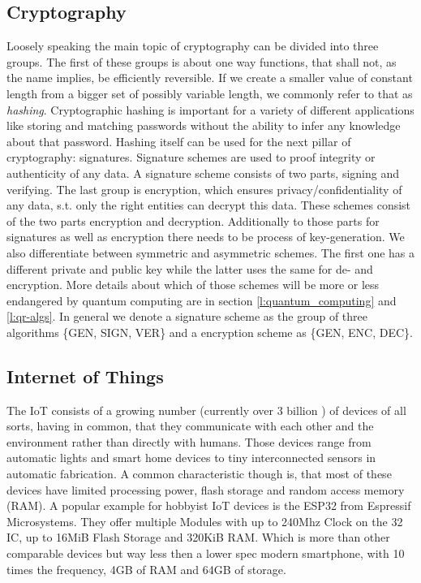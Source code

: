 \documentclass[conference]{IEEEtran}
\newcommand{\comment}[1]{}
\begin{document}
\subsection{Cryptography}\label{bg:crypto}
Loosely speaking the main topic of cryptography can be divided into three groups.
The first of these groups is about one way functions, that shall not, as the name implies, be efficiently reversible.
If we create a smaller value of constant length from a bigger set of possibly variable length, we commonly refer to that as \textit{hashing}.
Cryptographic hashing is important for a variety of different applications like storing and matching passwords without the ability to infer any knowledge about that password.
Hashing itself can be used for the next pillar of cryptography: signatures.
Signature schemes are used to proof integrity or authenticity of any data.
A signature scheme consists of two parts, signing and verifying. 
The last group is encryption, which ensures privacy/confidentiality of any data, s.t. only the right entities can decrypt this data.
These schemes consist of the two parts encryption and decryption.
Additionally to those parts for signatures as well as encryption there needs to be process of key-generation.
We also differentiate between symmetric and asymmetric schemes. The first one has a different private and public key while the latter uses the same for de- and encryption.
More details about which of those schemes will be more or less endangered by quantum computing are in section \ref{l:quantum_computing} and \ref{l:qr-algs}.
\newline
In general we denote a signature scheme as the group of three algorithms \{GEN, SIGN, VER\} and a encryption scheme as \{GEN, ENC, DEC\}.
\subsection{Internet of Things}\label{bg:iot}
\comment{ %
    - growing: over 3 billion rn \cite{QR_IoT}
} %

The IoT consists of a growing number (currently over 3 billion \cite{QR_IoT}) of devices of all sorts, having in common, that they communicate with each other and the environment rather than directly with humans.
Those devices range from automatic lights and smart home devices to tiny interconnected sensors in automatic fabrication.
A common characteristic though is, that most of these devices have limited processing power, flash storage and random access memory (RAM). 
A popular example for hobbyist IoT devices is the ESP32 from Espressif Microsystems.
They offer multiple Modules with up to 240Mhz Clock on the 32 IC, up to 16MiB Flash Storage and 320KiB RAM.
Which is more than other comparable devices but way less then a lower spec modern smartphone, with 10 times the frequency, 4GB of RAM and 64GB of storage.
\end{document}
